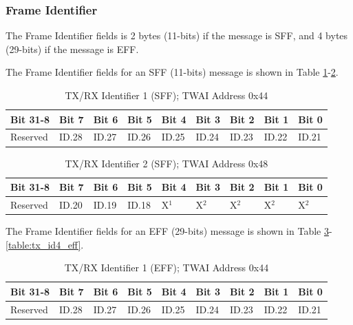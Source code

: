 \documentclass[main\_\_EN.tex]{subfiles}
\begin{document}
\subsubsection{Frame Identifier}
The Frame Identifier fields is 2 bytes (11-bits) if the message is SFF, and 4 bytes (29-bits) if the message is EFF.

The Frame Identifier fields for an SFF (11-bits) message is shown in Table \ref{table:tx_id1_sff}-\ref{table:tx_id2_sff}.

\begin{longtable}[c]{|p{1.4cm}|p{1.4cm}|p{1.4cm}|p{1.4cm}|p{1.4cm}|p{1.4cm}|p{1.4cm}|p{1.4cm}|p{1.4cm}|}
    \caption{TX/RX Identifier 1 (SFF); TWAI Address 0x44}
    \label{table:tx_id1_sff}\\
    \hline
       \rowcolor{lightgray}
    Bit 31-8 & Bit 7 & Bit 6 & Bit 5 & Bit 4 & Bit 3 & Bit 2 & Bit 1 & Bit 0\\
    \hline
    Reserved & ID.28 & ID.27 & ID.26 & ID.25 & ID.24 & ID.23 & ID.22 & ID.21\\
    \hline
\end{longtable}

\begin{longtable}[c]{|p{1.4cm}|p{1.4cm}|p{1.4cm}|p{1.4cm}|p{1.4cm}|p{1.4cm}|p{1.4cm}|p{1.4cm}|p{1.4cm}|}
    \caption{TX/RX Identifier 2 (SFF); TWAI Address 0x48}
    \label{table:tx_id2_sff}\\
    \hline
       \rowcolor{lightgray}
    Bit 31-8 & Bit 7 & Bit 6 & Bit 5 & Bit 4 & Bit 3 & Bit 2 & Bit 1 & Bit 0\\
    \hline
    Reserved & ID.20 & ID.19 & ID.18 & X$^1$ & X$^2$ & X$^2$ & X$^2$ & X$^2$\\
    \hline
\end{longtable}

The Frame Identifier fields for an EFF (29-bits) message is shown in Table \ref{table:tx_id1_eff}-\ref{table:tx_id4_eff}.

\begin{longtable}[c]{|p{1.4cm}|p{1.4cm}|p{1.4cm}|p{1.4cm}|p{1.4cm}|p{1.4cm}|p{1.4cm}|p{1.4cm}|p{1.4cm}|}
    \caption{TX/RX Identifier 1 (EFF); TWAI Address 0x44}
    \label{table:tx_id1_eff}\\
    \hline
       \rowcolor{lightgray}
    Bit 31-8 & Bit 7 & Bit 6 & Bit 5 & Bit 4 & Bit 3 & Bit 2 & Bit 1 & Bit 0\\
    \hline
    Reserved & ID.28 & ID.27 & ID.26 & ID.25 & ID.24 & ID.23 & ID.22 & ID.21\\
    \hline
\end{longtable}
\end{document}
